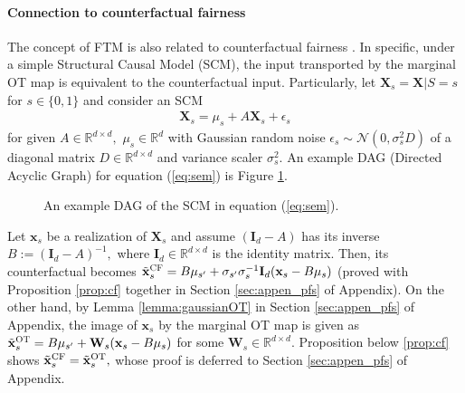 \documentclass[10pt]{article} %
\begin{document}
\paragraph{Connection to counterfactual fairness}
The concept of FTM is also related to counterfactual fairness \citep{https://doi.org/10.48550/arxiv.1703.06856}.
In specific, under a simple Structural Causal Model (SCM), the input transported by the marginal OT map is equivalent to the counterfactual input.
Particularly, let $\mathbf{X}_{s} = \mathbf{X} | S = s$ for $s \in \{0,1\}$ and consider an SCM 
\begin{equation}\label{eq:sem}
    \begin{split}
        \mathbf{X}_{s} = \mu_{s} + A \mathbf{X}_{s} + \epsilon_{s}
    \end{split}
\end{equation}
for given $A \in \mathbb{R}^{d \times d},$ $\mu_{s} \in \mathbb{R}^{d}$ with Gaussian random noise $\epsilon_{s} \sim \mathcal{N}(0, \sigma_{s}^{2} D)$ of a diagonal matrix $D \in \mathbb{R}^{d \times d}$ and variance scaler $\sigma_{s}^{2}.$
An example DAG (Directed Acyclic Graph) for equation (\ref{eq:sem}) is Figure \ref{fig:SCM}.

\begin{figure}
    \centering
    \caption{An example DAG of the SCM in equation (\ref{eq:sem}).}
    \label{fig:SCM}
\end{figure}

Let $\mathbf{x}_{s}$ be a realization of $\mathbf{X}_{s}$ and assume $(\mathbf{I}_{d}-A)$ has its inverse $B := (\mathbf{I}_{d}-A)^{-1},$ where $\mathbf{I}_{d} \in \mathbb{R}^{d \times d}$ is the identity matrix.
Then, its counterfactual becomes $\tilde{\mathbf{x}}_{s}^{\textsc{CF}} = B \mu_{s'} + \sigma_{s'} \sigma_{s}^{-1} \mathbf{I}_{d} (\mathbf{x}_{s} - B \mu_{s})$ (proved with Proposition \ref{prop:cf} together in Section \ref{sec:appen_pfs} of Appendix).
On the other hand, by Lemma \ref{lemma:gaussianOT} in Section \ref{sec:appen_pfs} of Appendix, the image of $\mathbf{x}_{s}$ by the marginal OT map is given as 
$ \tilde{\mathbf{x}}_{s}^{\textsc{OT}} = B \mu_{s'} + \mathbf{W}_s (\mathbf{x}_{s} - B \mu_{s}) $ for some $\mathbf{W}_s \in \mathbb{R}^{d \times d}.$
Proposition below \ref{prop:cf} shows $\tilde{\mathbf{x}}_{s}^{\textup{CF}} = \tilde{\mathbf{x}}_{s}^{\textup{OT}},$ whose proof is deferred to Section \ref{sec:appen_pfs} of Appendix.
\end{document}
